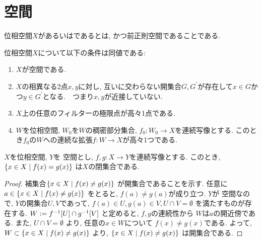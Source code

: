 \documentclass[uplatex, dvipdfmx, a4paper, 12pt, class=jsbook, crop=false]{standalone}
\begin{document}
\section{\Hausdorff 空間}
\label{sec:Hausdorff-spaces}

\begin{definition}
	位相空間$ X $があるいはであるとは, かつ前正則空間であることである.
\end{definition}

\begin{proposition}
	位相空間$ X $について以下の条件は同値である:
	\begin{enumerate}
		\item $ X $が空間である.
		\item $ X $の相異なる2点$ x, y $に対し, 互いに交わらない開集合$ G, G^\prime $が存在して$ x \in G$かつ$ y \in G^\prime $となる.　つまり$ x, y $が近接していない.
		\item $ X $上の任意のフィルターの極限点が高々1点である.
		\item $ W $を位相空間, $ W_0 $を$ W $の稠密部分集合, $ f_0 \colon W_0 \rightarrow X $を連続写像とする. このとき$ f_0 $の$ W $への連続な拡張$ f \colon W \rightarrow X$が高々1つである.
	\end{enumerate}
\end{proposition}

\begin{proposition}
	\label{h00001}
	\( X \)を位相空間, \( Y \)を \Hausdorff 空間とし,
	\( f, g \colon X \to Y \)を連続写像とする.
	このとき, \( \setcomp{x \in X}{f(x) = g(x)} \)
	は\( X \)の閉集合である.
\end{proposition}

\begin{proof}
	補集合\( \setcomp{x \in X}{f(x) \neq g(x)} \)
	が開集合であることを示す.
	任意に\( a \in \setcomp{x \in X}{f(x) \neq g(x)} \)
	をとると, \( f(a) \neq g(a) \)が成り立つ.
	\( Y \)が \Hausdorff 空間なので,
	\( Y \)の開集合\( U, V \)であって,
	\( f(a) \in U, g(a) \in V, U \cap V = \emptyset \)
	を満たすものが存在する.
	\( W \defeq \mapinvset{f}{U} \cap \mapinvset{g}{V} \)
	と定めると, \( f, g \)の連続性から
	\( W \)は\( a \)の開近傍である.
	また, \( U \cap V = \emptyset \)
	より, 任意の\( x \in W \)について
	\( f(x) \neq g(x) \)である.
	よって, \( W \subset \setcomp{x \in X}{f(x) \neq g(x)} \)
	より, \( \setcomp{x \in X}{f(x) \neq g(x)} \)
	は開集合である.
\end{proof}
\end{document}

